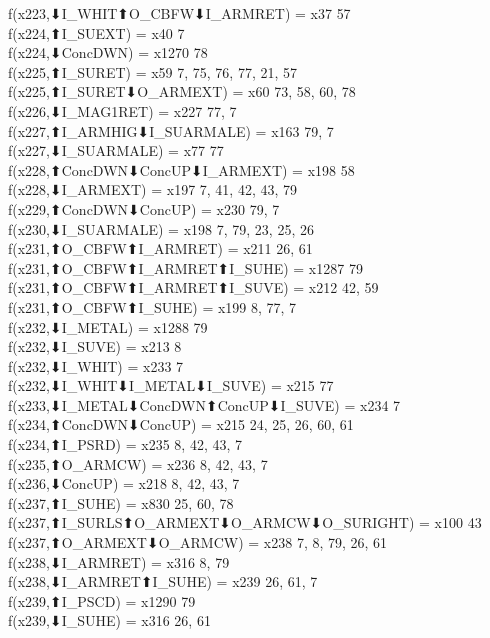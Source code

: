 f(x223,⬇I_WHIT⬆O_CBFW⬇I_ARMRET) = x37 {57} \\
f(x224,⬆I_SUEXT) = x40 {7} \\
f(x224,⬇ConcDWN) = x1270 {78} \\
f(x225,⬆I_SURET) = x59 {7, 75, 76, 77, 21, 57} \\
f(x225,⬆I_SURET⬇O_ARMEXT) = x60 {73, 58, 60, 78} \\
f(x226,⬇I_MAG1RET) = x227 {77, 7} \\
f(x227,⬆I_ARMHIG⬇I_SUARMALE) = x163 {79, 7} \\
f(x227,⬇I_SUARMALE) = x77 {77} \\
f(x228,⬆ConcDWN⬇ConcUP⬇I_ARMEXT) = x198 {58} \\
f(x228,⬇I_ARMEXT) = x197 {7, 41, 42, 43, 79} \\
f(x229,⬆ConcDWN⬇ConcUP) = x230 {79, 7} \\
f(x230,⬇I_SUARMALE) = x198 {7, 79, 23, 25, 26} \\
f(x231,⬆O_CBFW⬆I_ARMRET) = x211 {26, 61} \\
f(x231,⬆O_CBFW⬆I_ARMRET⬆I_SUHE) = x1287 {79} \\
f(x231,⬆O_CBFW⬆I_ARMRET⬆I_SUVE) = x212 {42, 59} \\
f(x231,⬆O_CBFW⬆I_SUHE) = x199 {8, 77, 7} \\
f(x232,⬇I_METAL) = x1288 {79} \\
f(x232,⬇I_SUVE) = x213 {8} \\
f(x232,⬇I_WHIT) = x233 {7} \\
f(x232,⬇I_WHIT⬇I_METAL⬇I_SUVE) = x215 {77} \\
f(x233,⬇I_METAL⬇ConcDWN⬆ConcUP⬇I_SUVE) = x234 {7} \\
f(x234,⬆ConcDWN⬇ConcUP) = x215 {24, 25, 26, 60, 61} \\
f(x234,⬆I_PSRD) = x235 {8, 42, 43, 7} \\
f(x235,⬆O_ARMCW) = x236 {8, 42, 43, 7} \\
f(x236,⬇ConcUP) = x218 {8, 42, 43, 7} \\
f(x237,⬆I_SUHE) = x830 {25, 60, 78} \\
f(x237,⬆I_SURLS⬆O_ARMEXT⬇O_ARMCW⬇O_SURIGHT) = x100 {43} \\
f(x237,⬆O_ARMEXT⬇O_ARMCW) = x238 {7, 8, 79, 26, 61} \\
f(x238,⬇I_ARMRET) = x316 {8, 79} \\
f(x238,⬇I_ARMRET⬆I_SUHE) = x239 {26, 61, 7} \\
f(x239,⬆I_PSCD) = x1290 {79} \\
f(x239,⬇I_SUHE) = x316 {26, 61} \\
